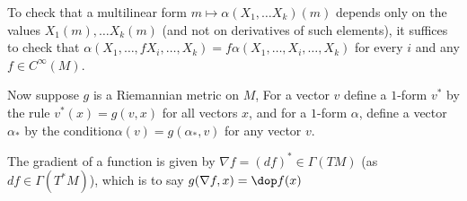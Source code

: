 To check that a multilinear form $m \mapsto \alpha(X_1,\dots X_k)(m)$ depends only on the values $X_1(m),\dots X_k(m)$ (and not on derivatives of such elements), it suffices to check that $\alpha(X_1 ,\dots, fX_i,\dots, X_k) = f \alpha(X_1 ,\dots, X_i,\dots, X_k)$ for every $i$ and any $f\in C^\infty(M)$.

Now suppose $g$ is a Riemannian metric on $M$, For a vector $v$ define a $1$-form $v^*$ by the rule $v^*(x)=g(v,x)$ for all vectors $x$, and for a $1$-form $\alpha$, define a vector $\alpha_*$ by the condition$ \alpha(v)=g(\alpha_*,v)$ for any vector $v$.

The gradient of a function is given by $\nabla f = (df)^* \in \Gamma(TM)$ (as $df \in \Gamma(T^*M)$), which is to say $g(\nabla f, x) = \dop f (x)$